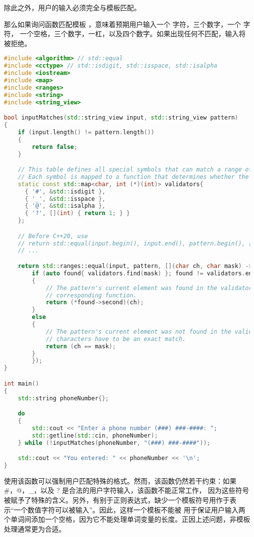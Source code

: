 \documentclass[../../LearnCpp.tex]{subfiles}
\begin{document}
除此之外，用户的输入必须完全与模板匹配。

那么如果询问函数匹配模板 \acode{(###)###-####}，意味着预期用户输入一个 \acode{(} 字符，三个数字，一个 \acode{)} 字符，
一个空格，三个数字，一杠，以及四个数字。如果出现任何不匹配，输入将被拒绝。

\begin{lstlisting}[language=C++]
#include <algorithm> // std::equal
#include <cctype> // std::isdigit, std::isspace, std::isalpha
#include <iostream>
#include <map>
#include <ranges>
#include <string>
#include <string_view>

bool inputMatches(std::string_view input, std::string_view pattern)
{
    if (input.length() != pattern.length())
    {
        return false;
    }

    // This table defines all special symbols that can match a range of user input
    // Each symbol is mapped to a function that determines whether the input is valid for that symbol
    static const std::map<char, int (*)(int)> validators{
      { '#', &std::isdigit },
      { '_', &std::isspace },
      { '@', &std::isalpha },
      { '?', [](int) { return 1; } }
    };

    // Before C++20, use
    // return std::equal(input.begin(), input.end(), pattern.begin(), [](char ch, char mask) -> bool {
    // ...

    return std::ranges::equal(input, pattern, [](char ch, char mask) -> bool {
        if (auto found{ validators.find(mask) }; found != validators.end())
        {
            // The pattern's current element was found in the validators. Call the
            // corresponding function.
            return (*found->second)(ch);
        }
        else
        {
            // The pattern's current element was not found in the validators. The
            // characters have to be an exact match.
            return (ch == mask);
        }
        });
}

int main()
{
    std::string phoneNumber{};

    do
    {
        std::cout << "Enter a phone number (###) ###-####: ";
        std::getline(std::cin, phoneNumber);
    } while (!inputMatches(phoneNumber, "(###) ###-####"));

    std::cout << "You entered: " << phoneNumber << '\n';
}
\end{lstlisting}

使用该函数可以强制用户匹配特殊的格式。然而，该函数仍然若干约束：如果 \#，@，\_，以及 ? 是合法的用户字符输入，该函数不能正常工作，
因为这些符号被赋予了特殊的含义。另外，有别于正则表达式，缺少一个模板符号用作于表示“一个数值字符可以被输入”。因此，这样一个模板不能被
用于保证用户输入两个单词间添加一个空格，因为它不能处理单词变量的长度。正因上述问题，非模板处理通常更为合适。
\end{document}
